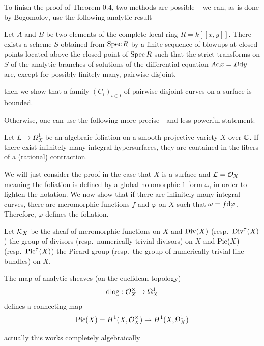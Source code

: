 \documentclass[main.tex]{subfiles}
\begin{document}
To finish the proof of Theorem 0.4, two methods are possible -- we can, as is done by Bogomolov, use the following analytic result

\begin{theorem}[Seidenberg]
Let $A$ and $B$ be two elements of the complete local ring $R = k[[x,y]]$. There exists a scheme $S$ obtained from $\operatorname{\mathrm{Spec}}{R}$ by a finite sequence of blowups at closed points located above the closed point of $\operatorname{\mathrm{Spec}}{R}$ such that the strict transforms on $S$ of the analytic branches of solutions of the differential equation $A \mathrm{d}{x} = B \mathrm{d}{y}$ are, except for possibly finitely many, pairwise disjoint.
\end{theorem}

then we show that a family $(C_i)_{i \in I}$ of pairwise disjoint curves on a surface is bounded.

Otherwise, one can use the following more precise - and less powerful statement:


\begin{theorem}[Jouanolou]
Let $L \to \Omega_X^1$ be an algebraic foliation on a smooth projective variety $X$ over $\mathbb{C}$. If there exist infinitely many integral hypersurfaces, they are contained in the fibers of a (rational) contraction.
\end{theorem}

We will just consider the proof in the case that $X$ is a surface and $\mathcal{L} = \mathcal{O}_{X}$ -- meaning the foliation is defined by a global holomorphic $1$-form $\omega$, in order to lighten the notation. We now show that if there are infinitely many integral curves, there are meromorphic functions $f$ and $\varphi$ on $X$ such that $\omega = f \mathrm{d}{\varphi}$. Therefore, $\varphi$ defines the foliation.
\par
Let $\mathcal{K}_X$ be the sheaf of meromorphic functions on $X$ and $\operatorname{\mathrm{Div}}(X)$ (resp.\ $\operatorname{\mathrm{Div}}^{\tau}(X)$) the group of divisors (resp.\ numerically trivial divisors) on $X$ and $\operatorname{\mathrm{Pic}}(X)$ (resp.\ $\operatorname{\mathrm{Pic}}^{\tau}(X)$) the Picard group (resp.\ the group of numerically trivial line bundles) on $X$.
\par
The map of analytic sheaves (on the euclidean topology)
\[ \mathrm{d}{\log} : \mathcal{O}_{X}^\times \to \Omega_X^1 \]
defines a connecting map
\[ \operatorname{\mathrm{Pic}}(X) = H^1(X, \mathcal{O}_{X}^\times) \to H^1(X, \Omega_X^1) \]

{\color{red} actually this works completely algebraically}
\end{document}
